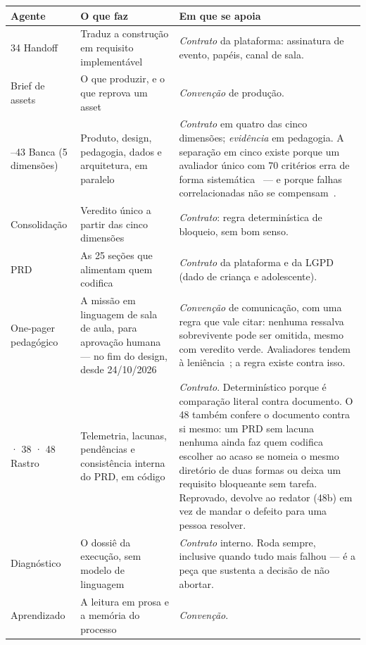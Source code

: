 \documentclass[11pt,a4paper]{article}
\begin{document}
\begin{center}
\begin{longtable}{p{2.5cm}p{5.4cm}p{6.6cm}}
\toprule
\textbf{Agente} & \textbf{O que faz} & \textbf{Em que se apoia} \\
\midrule
\endfirsthead
34 Handoff & Traduz a construção em requisito implementável &
\textit{Contrato} da plataforma: assinatura de evento, papéis, canal de sala. \\
\addlinespace
35 Brief de assets & O que produzir, e o que reprova um asset &
\textit{Convenção} de produção. \\
\addlinespace
39--43 Banca (5 dimensões) & Produto, design, pedagogia, dados e arquitetura, em paralelo &
\textit{Contrato} em quatro das cinco dimensões; \textit{evidência} em pedagogia. A separação em
cinco existe porque um avaliador único com 70 critérios erra de forma
sistemática~\cite{ifscale2025b} --- e porque falhas correlacionadas não se
compensam~\cite{knight1986b}. \\
\addlinespace
44 Consolidação & Veredito único a partir das cinco dimensões &
\textit{Contrato}: regra determinística de bloqueio, sem bom senso. \\
\addlinespace
47 PRD & As 25 seções que alimentam quem codifica &
\textit{Contrato} da plataforma e da LGPD (dado de criança e adolescente). \\
\addlinespace
49 One-pager pedagógico & A missão em linguagem de sala de aula, para aprovação humana --- no fim do design, desde 24/10/2026 &
\textit{Convenção} de comunicação, com uma regra que vale citar: nenhuma ressalva sobrevivente pode
ser omitida, mesmo com veredito verde. Avaliadores tendem à leniência~\cite{zheng2023b}; a regra
existe contra isso. \\
\addlinespace
36 · 38 · 48 Rastro & Telemetria, lacunas, pendências e consistência interna do PRD, em código &
\textit{Contrato}. Determinístico porque é comparação literal contra documento. O 48 também confere
o documento contra si mesmo: um PRD sem lacuna nenhuma ainda faz quem codifica escolher ao acaso se
nomeia o mesmo diretório de duas formas ou deixa um requisito bloqueante sem tarefa. Reprovado,
devolve ao redator (48b) em vez de mandar o defeito para uma pessoa resolver. \\
\addlinespace
50 Diagnóstico & O dossiê da execução, sem modelo de linguagem &
\textit{Contrato} interno. Roda sempre, inclusive quando tudo mais falhou --- é a peça que sustenta
a decisão de não abortar. \\
\addlinespace
51 Aprendizado & A leitura em prosa e a memória do processo &
\textit{Convenção}. \\
\bottomrule
\end{longtable}
\end{center}
\end{document}
